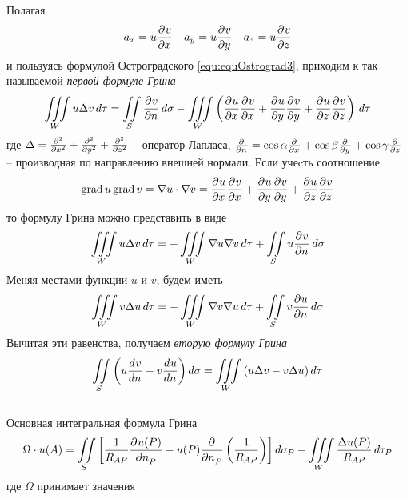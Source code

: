 Полагая
\[
	a_x = u \frac{\partial^{}v}{\partial x^{}} \quad	a_y = u \frac{\partial^{}v}{\partial y^{}} \quad a_z = u \frac{\partial^{}v}{\partial z^{}}
\]
и пользуясь формулой Остроградского \eqref{equ:equOstrograd3}, приходим к так называемой \textit{первой формуле Грина}
\begin{equation}
	\iiint\limits_W u \Delta v \, d\tau = \iint\limits_S \frac{\partial^{}v}{\partial n^{}} \, d \sigma - \iiint\limits_W \left( \frac{\partial^{}u}{\partial x^{}} \frac{\partial^{}v}{\partial x^{}} + \frac{\partial^{}u}{\partial y^{}} \frac{\partial^{}v}{\partial y^{}} + \frac{\partial^{}u}{\partial z^{}} \frac{\partial^{}v}{\partial z^{}}\right)\, d \tau
\end{equation}
где $\Delta = \frac{\partial^{2}}{\partial x^{2}} + \frac{\partial^{2}}{\partial y^{2}} + \frac{\partial^{2}}{\partial z^{2}}$ -- оператор Лапласа, $\frac{\partial^{}}{\partial n^{}} = \cos \alpha \frac{\partial^{}}{\partial x^{}} + \cos \beta \frac{\partial^{}}{\partial y^{}} + \cos \gamma \frac{\partial^{}}{\partial z^{}}$ -- производная по направлению внешней нормали.
	Если учеcть соотношение
\[
	\mathrm{grad}\,u\, \mathrm{grad}\, v = \nabla u \cdot \nabla v = \frac{\partial^{}u}{\partial x^{}} \frac{\partial^{}v}{\partial x^{}} + \frac{\partial^{}u}{\partial y^{}} \frac{\partial^{}v}{\partial y^{}} + \frac{\partial^{}u}{\partial z^{}} \frac{\partial^{}v}{\partial z^{}}
\]
то формулу Грина можно представить в виде
\[
	\iiint\limits_W u \Delta v \, d \tau = - \iiint\limits_W \nabla u \nabla v \, d \tau + \iint\limits_S u \frac{\partial^{}v}{\partial n^{}} \, d \sigma
\]
Меняя местами функции $u$ и $v$, будем иметь
\[
	\iiint\limits_W v \Delta u \, d \tau = - \iiint\limits_W \nabla v \nabla u \, d \tau + \iint\limits_S v \frac{\partial^{}u}{\partial n^{}} \, d \sigma
\]
Вычитая эти равенства, получаем \textit{вторую формулу Грина}
\begin{equation}
			\iint\limits_S \left(u \frac{d^{}v}{dn^{}} - v \frac{d^{}u}{dn^{}}\right) d\sigma = \iiint\limits_{W} \left(u \Delta v - v \Delta u \right) d \tau
	\label{equ:Green1}
\end{equation}\\
Основная интегральная формула Грина
\begin{equation}
	\Omega \cdot u(A) = \iint\limits_S \left[ \frac{1}{R_{AP}} \frac{\partial^{}u(P)}{\partial n_P^{}}  - u (P) \frac{\partial^{}}{\partial n_P^{}} \left( \frac{1}{R_{AP}} \right) \right] d\sigma_P - \iiint\limits_W \frac{\Delta u (P)}{R_{AP}}\, d\tau_P
	\label{equ:equMainGreen3d}
\end{equation}
где $\Omega$ принимает значения 

